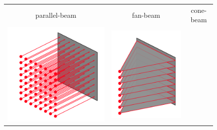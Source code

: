 \documentclass[11pt]{article}
\begin{document}
\begin{figure}[h]
\begin{tabular}{ccc}
parallel-beam & fan-beam & cone-beam \\
\includegraphics[scale=0.33]{parallelBeam}
& \includegraphics[scale=0.35]{fanBeam}

\end{tabular}
\end{figure}
\end{document}

